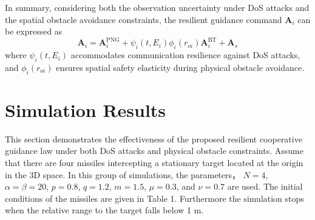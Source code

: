\documentclass[lettersize,journal]{IEEEtran}
\begin{document}
In summary, considering both the observation uncertainty under DoS attacks and the spatial obstacle avoidance constraints, the resilient guidance command $\boldsymbol A_i$ can be expressed as
\begin{equation}
	\label{eq:fully_resilient}
	\boldsymbol A_i = \boldsymbol{A}_i^{\mathrm{PNG}} + \psi_i(t, E_i) \phi_i(r_{oi}) \boldsymbol{A}_i^{\mathrm{BT}} + \boldsymbol{A}_s
\end{equation}
where $\psi_i(t, E_i)$ accommodates communication resilience against DoS attacks, and $\phi_i(r_{oi})$ ensures spatial safety elasticity during physical obstacle avoidance.

\section{Simulation Results}
This section demonstrates the effectiveness of the proposed resilient cooperative guidance law under both DoS attacks and physical obstacle constraints. Assume that there are four missiles intercepting a stationary target located at the origin in the 3D space. In
this group of simulations, the parameters， $N = 4$, $\alpha = \beta = 20$, $p = 0.8$, $q = 1.2$, $m = 1.5$, $\mu = 0.3$, and $\nu = 0.7$ are used. The initial conditions of the missiles are given in Table 1. Furthermore the simulation stops when the relative range to the target falls below 1 m.%
\end{document}
